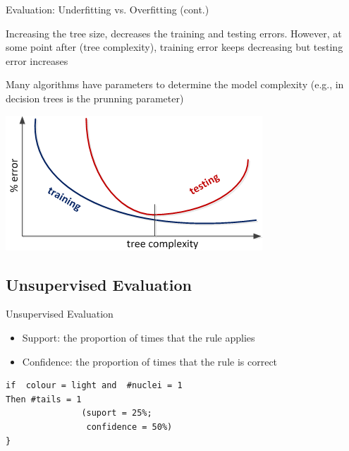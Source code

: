 \documentclass{beamer}
\begin{document}
\begin{frame}{Evaluation: Underfitting vs. Overfitting (cont.)}

Increasing the tree size, decreases the training and testing errors. However, at some point after (tree complexity), training error keeps decreasing but testing error increases

Many algorithms have parameters to determine the model complexity (e.g., in decision trees is the prunning parameter)

\begin{center}
\includegraphics[width=.6\textwidth]{figs/overFittingDecisionTress}
\end{center}


\end{frame}



% 
% 
% 


\subsection{Unsupervised Evaluation}


\begin{frame}[fragile]{Unsupervised Evaluation}

\begin{itemize}
 \item \alert{Support}: the proportion of times that the rule applies
 \item \alert{Confidence}: the proportion of times that the rule is correct
\end{itemize}

\begin{verbatim}
if  colour = light and  #nuclei = 1 
Then #tails = 1   	
               (suport = 25%; 
                confidence = 50%)
}
\end{verbatim}


\end{frame}
\end{document}
